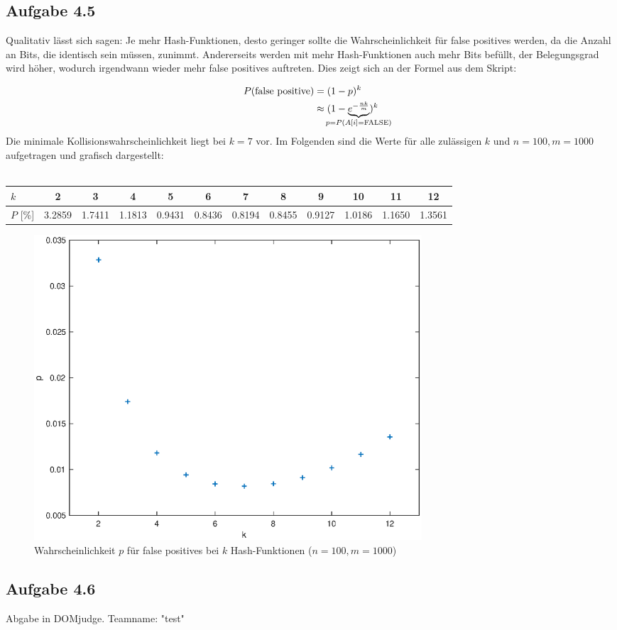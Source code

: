 \documentclass{article}
\begin{document}
    \subsection*{Aufgabe 4.5}
    Qualitativ lässt sich sagen: Je mehr Hash-Funktionen, desto geringer sollte die Wahrscheinlichkeit für false positives werden, da die Anzahl an Bits, die identisch sein müssen, zunimmt. Andererseits werden mit mehr Hash-Funktionen auch mehr Bits befüllt, der Belegungsgrad wird höher, wodurch irgendwann wieder mehr false positives auftreten. Dies zeigt sich an der Formel aus dem Skript:

    \begin{align*}
        P(\text{false positive}) &= (1-p)^k \\
        &\approx (1 - \underbrace{e^{-\frac{nk}{m}}}_{\mathclap{p=P(A[i]=\mathrm{FALSE})}})^k 
    \end{align*}
    Die minimale Kollisionswahrscheinlichkeit liegt bei $k=7$ vor. Im Folgenden sind die Werte für alle zulässigen $k$ und $n=100, m=1000$ aufgetragen und grafisch dargestellt:\\\\
    \begin{tabular}{l|ccccccccccc}
        $k$ & 2 & 3 & 4 & 5 & 6 & 7 & 8 & 9 & 10 & 11 & 12 \\ \hline
        $P$ [\%] & 3.2859 & 1.7411 & 1.1813 & 0.9431 & 0.8436 & 0.8194 & 0.8455 & 0.9127 & 1.0186 & 1.1650 & 1.3561
    \end{tabular}
    \begin{figure}[h]
        \centering
        \includegraphics[width=0.7\textwidth]{plot_4_4.eps}
        \caption{Wahrscheinlichkeit $p$ für false positives bei $k$ Hash-Funktionen ($n=100, m=1000$)}
    \end{figure}
    

    \subsection*{Aufgabe 4.6}
    Abgabe in DOMjudge. Teamname: "test"
\end{document}
